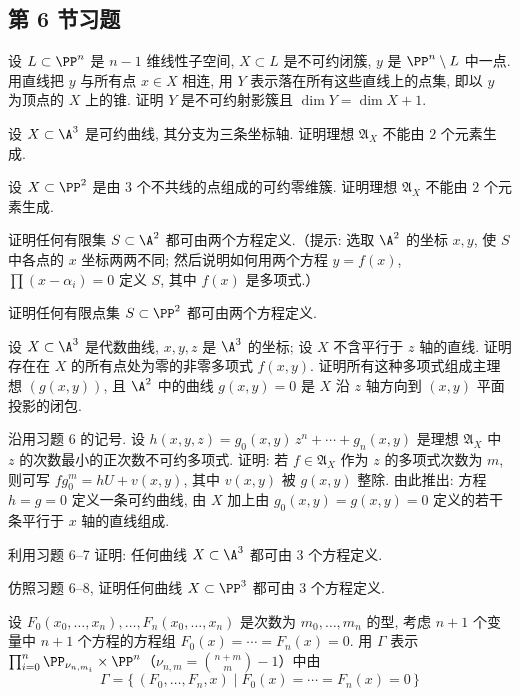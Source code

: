 \subsection{第 6 节习题}

\begin{compactenum}
	\item 设 $L \subset \PP^n$ 是 $n-1$ 维线性子空间, $X \subset L$ 是不可约闭簇, $y$ 是 $\PP^n \setminus L$ 中一点. 用直线把 $y$ 与所有点 $x \in X$ 相连, 用 $Y$ 表示落在所有这些直线上的点集, 即以 $y$ 为顶点的 $X$ 上的锥. 证明 $Y$ 是不可约射影簇且 $\dim Y = \dim X + 1$.
	\item 设 $X \subset \A^3$ 是可约曲线, 其分支为三条坐标轴. 证明理想 $\mathfrak A_X$ 不能由 $2$ 个元素生成.
	\item 设 $X \subset \PP^2$ 是由 $3$ 个不共线的点组成的可约零维簇. 证明理想 $\mathfrak A_X$ 不能由 $2$ 个元素生成.
	\item 证明任何有限集 $S \subset \A^2$ 都可由两个方程定义.（提示: 选取 $\A^2$ 的坐标 $x, y$, 使 $S$ 中各点的 $x$ 坐标两两不同; 然后说明如何用两个方程 $y = f(x)$, $\prod (x - \alpha_i) = 0$ 定义 $S$, 其中 $f(x)$ 是多项式.）
	\item 证明任何有限点集 $S \subset \PP^2$ 都可由两个方程定义.
	\item 设 $X \subset \A^3$ 是代数曲线, $x, y, z$ 是 $\A^3$ 的坐标; 设 $X$ 不含平行于 $z$ 轴的直线. 证明存在在 $X$ 的所有点处为零的非零多项式 $f(x, y)$. 证明所有这种多项式组成主理想 $(g(x,y))$, 且 $\A^2$ 中的曲线 $g(x,y) = 0$ 是 $X$ 沿 $z$ 轴方向到 $(x,y)$ 平面投影的闭包.
	\item 沿用习题 6 的记号. 设 $h(x,y,z) = g_0(x,y)\, z^n + \cdots + g_n(x,y)$ 是理想 $\mathfrak A_X$ 中 $z$ 的次数最小的正次数不可约多项式. 证明: 若 $f \in \mathfrak A_X$ 作为 $z$ 的多项式次数为 $m$, 则可写 $f g_0^m = hU + v(x,y)$, 其中 $v(x,y)$ 被 $g(x,y)$ 整除. 由此推出: 方程 $h = g = 0$ 定义一条可约曲线, 由 $X$ 加上由 $g_0(x,y) = g(x,y) = 0$ 定义的若干条平行于 $x$ 轴的直线组成.
	\item 利用习题 6--7 证明: 任何曲线 $X \subset \A^3$ 都可由 $3$ 个方程定义.
	\item 仿照习题 6--8, 证明任何曲线 $X \subset \PP^3$ 都可由 $3$ 个方程定义.
	\item 设 $F_0(x_0, \ldots, x_n), \ldots, F_n(x_0, \ldots, x_n)$ 是次数为 $m_0, \ldots, m_n$ 的型, 考虑 $n+1$ 个变量中 $n+1$ 个方程的方程组 $F_0(x) = \cdots = F_n(x) = 0$. 用 $\Gamma$ 表示 $\prod_{i=0}^{n} \PP_{\nu_{n,m_i}} \times \PP^n$（$\nu_{n,m} = \binom{n+m}{m} - 1$）中由
	\[
		\Gamma = \{\, (F_0, \ldots, F_n, x) \mid F_0(x) = \cdots = F_n(x) = 0 \,\}
\]
\end{compactenum}
